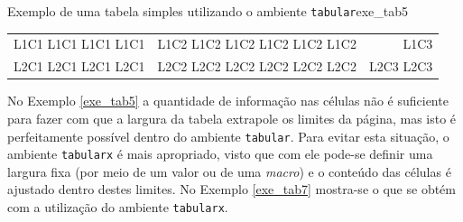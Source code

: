 \begin{texexptitled}[breakable,center lower,enhanced,middle=2mm]{Exemplo de uma tabela simples utilizando o ambiente {\tt tabular}}{exe_tab5}
\begin{tabular}{|l|c|r|}
\hline
L1C1 L1C1 L1C1 L1C1 & L1C2 L1C2 L1C2 L1C2 L1C2 L1C2 & L1C3      \\
L2C1 L2C1 L2C1 L2C1 & L2C2 L2C2 L2C2 L2C2 L2C2 L2C2 & L2C3 L2C3 \\
\hline
\end{tabular}
\end{texexptitled}

No Exemplo \ref{exe_tab5} a quantidade de informação nas células não é suficiente para fazer com que a largura da tabela extrapole os limites da página, mas isto é perfeitamente possível dentro do ambiente {\tt tabular}. Para evitar esta situação, o ambiente {\tt tabularx} é mais apropriado, visto que com ele pode-se definir uma largura fixa (por meio de um valor ou de uma \textit{macro}) e o conteúdo das células é ajustado dentro destes limites. No Exemplo \ref{exe_tab7} mostra-se o que se obtém com a utilização do ambiente {\tt tabularx}.


%

